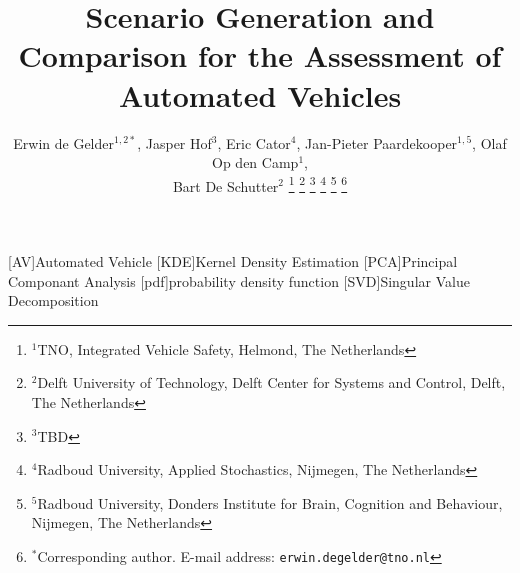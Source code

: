 \documentclass[conference, a4paper]{ieeeconf}
\title{Scenario Generation and Comparison for the Assessment of Automated Vehicles}
\author{Erwin de Gelder$^{1,2*}$, Jasper Hof$^{3}$, Eric Cator$^{4}$, Jan-Pieter Paardekooper$^{1,5}$, Olaf Op den Camp$^{1}$, \\Bart De Schutter$^{2}$%
\thanks{$^{1}$TNO, Integrated Vehicle Safety, Helmond, The Netherlands}%
\thanks{$^{2}$Delft University of Technology, Delft Center for Systems and Control, Delft, The Netherlands}%
\thanks{$^{3}$TBD}%
\thanks{$^{4}$Radboud University, Applied Stochastics, Nijmegen, The Netherlands}%
\thanks{$^{5}$Radboud University, Donders Institute for Brain, Cognition and Behaviour, Nijmegen, The Netherlands}%
\thanks{$^{*}$Corresponding author. \newline E-mail address: {\tt\small erwin.degelder@tno.nl}}}%
\date{}
\begin{document}
\begin{acronym}[AAAAAAAA]
	[AV]{Automated Vehicle}
	[KDE]{Kernel Density Estimation}
	[PCA]{Principal Componant Analysis}
	[pdf]{probability density function}
	[SVD]{Singular Value Decomposition}
\end{acronym}

\maketitle


\acresetall





\acresetall





\printbibliography
\end{document}
